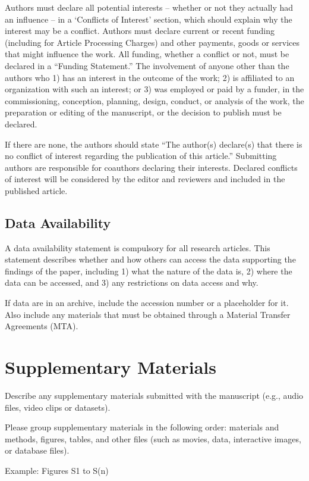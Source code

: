 \documentclass{article}
\begin{document}
Authors must declare all potential interests – whether or not they actually had an influence – in a ‘Conflicts of Interest’ section, which should explain why the interest may be a conflict. Authors must declare current or recent funding (including for Article Processing Charges) and other payments, goods or services that might influence the work. All funding, whether a conflict or not, must be declared in a ``Funding Statement.'' The involvement of anyone other than the authors who 1) has an interest in the outcome of the work; 2) is affiliated to an organization with such an interest; or 3) was employed or paid by a funder, in the commissioning, conception, planning, design, conduct, or analysis of the work, the preparation or editing of the manuscript, or the decision to publish must be declared.

If there are none, the authors should state ``The author(s) declare(s) that there is no conflict of interest regarding the publication of this article.'' Submitting authors are responsible for coauthors declaring their interests. Declared conflicts of interest will be considered by the editor and reviewers and included in the published article.

\subsection*{Data Availability}
A data availability statement is compulsory for all research articles. This statement describes whether and how others can access the data supporting the findings of the paper, including 1) what the nature of the data is, 2) where the data can be accessed, and 3) any restrictions on data access and why.

If data are in an archive, include the accession number or a placeholder for it. Also include any materials that must be obtained through a Material Transfer Agreements (MTA). 

\section*{Supplementary Materials}
Describe any supplementary materials submitted with the manuscript (e.g., audio files, video clips or datasets). 

Please group supplementary materials in the following order: materials and methods, figures, tables, and other files (such as movies, data, interactive images, or database files). 

\medskip Example:
Figures S1 to S(n) 
\end{document}
